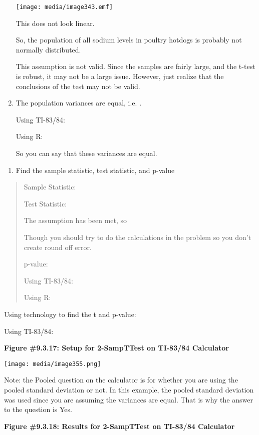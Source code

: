 \documentclass[]{book}
\providecommand{\tightlist}{%
  \setlength{\itemsep}{0pt}\setlength{\parskip}{0pt}}
\begin{document}
\begin{enumerate}
  \texttt{[image: media/image343.emf]}

  This does not look linear.

  So, the population of all sodium levels in poultry hotdogs is
  probably not normally distributed.

  This assumption is not valid. Since the samples are fairly large,
  and the t-test is robust, it may not be a large issue. However, just
  realize that the conclusions of the test may not be valid.
\item
  The population variances are equal, i.e. .

  Using TI-83/84:

  Using R:

  So you can say that these variances are equal.
\end{enumerate}

\begin{enumerate}
\def\labelenumi{\arabic{enumi}.}
\setcounter{enumi}{3}
\tightlist
\item
  Find the sample statistic, test statistic, and p-value
\end{enumerate}

\begin{quote}
Sample Statistic:

Test Statistic:

The assumption has been met, so

Though you should try to do the calculations in the problem so you
don't create round off error.

p-value:

Using TI-83/84:

Using R:
\end{quote}

Using technology to find the t and p-value:

Using TI-83/84:

\textbf{Figure \#9.3.17: Setup for 2-SampTTest on TI-83/84 Calculator}

\texttt{[image: media/image355.png]}

Note: the Pooled question on the calculator is for whether you are using
the pooled standard deviation or not. In this example, the pooled
standard deviation was used since you are assuming the variances are
equal. That is why the answer to the question is Yes.

\textbf{Figure \#9.3.18: Results for 2-SampTTest on TI-83/84 Calculator}
\end{document}
